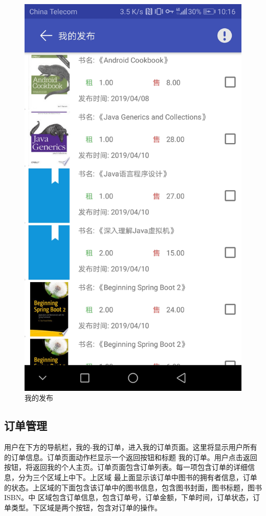 \begin{figure}[h]
	\centering
	\includegraphics[scale=0.09]{Chapters/UI/myubook.jpg}
	\caption{我的发布}
	\label{myubook}
\end{figure}

\subsection{订单管理}
用户在下方的导航栏，我的-我的订单，进入我的订单页面。这里将显示用户所有的订单信息。订单页面动作栏显示一个返回按钮和标题
我的订单。用户点击返回按钮，将返回我的个人主页。订单页面包含订单列表。每一项包含订单的详细信息，分为三个区域上中下。上区域
最上面显示该订单中图书的拥有者信息，订单的状态。上区域的下面包含该订单中的图书信息，包含图书封面，图书标题，图书 ISBN。中
区域包含订单信息，包含订单号，订单金额，下单时间，订单状态，订单类型。下区域是两个按钮，包含对订单的操作。

